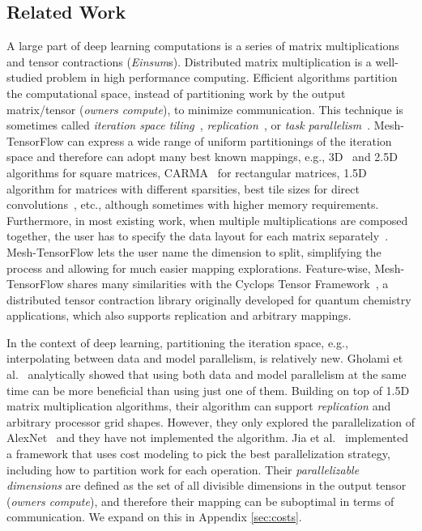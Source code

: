 \documentclass{article}
\begin{document}
\begin{itemize}
\section{Related Work}
A large part of deep learning computations is a series of matrix multiplications and tensor contractions (\emph{Einsum}s). Distributed matrix multiplication is a well-studied problem in high performance computing. Efficient algorithms partition the computational space, instead of partitioning work by the output matrix/tensor (\emph{owners compute}), to minimize communication. This technique is sometimes called \emph{iteration space tiling}~\cite{Wolfe:1989:MIS:76263.76337}, \emph{replication}~\cite{SD_EUROPAR_2011}, or \emph{task parallelism}~\cite{Calvin:2015:STA:2833179.2833186}. 
Mesh-TensorFlow can express a wide range of uniform partitionings of the iteration space 
and therefore can adopt many best known mappings, e.g., 3D~\cite{Aggarwal:1990:CCP:77831.77836, berntsen1989communication} and 2.5D~\cite{SD_EUROPAR_2011} algorithms for square matrices, CARMA~\cite{demmel2013communication} for rectangular matrices, 1.5D~\cite{SpDM3} algorithm for matrices with different sparsities, best tile sizes for direct convolutions~\cite{demmel2018communication}, etc., although sometimes with higher memory requirements. 
Furthermore, in most existing work,
when multiple multiplications are composed together, the user has to specify the data layout for each matrix separately~\cite{pmlr-v84-koanantakool18a}. Mesh-TensorFlow lets the user name the dimension to split, simplifying the process and allowing for much easier mapping explorations. Feature-wise, Mesh-TensorFlow shares many similarities with the Cyclops Tensor Framework~\cite{solomonik2014massively}, a distributed tensor contraction library originally developed for quantum chemistry applications, which also supports replication and arbitrary mappings.


In the context of deep learning, partitioning the iteration space, e.g., interpolating between data and model parallelism, is relatively new. Gholami et al.~\cite{gholami2017integrated} analytically showed that using both data and model parallelism at the same time can be more beneficial than using just one of them. Building on top of 1.5D matrix multiplication algorithms, their algorithm can support \emph{replication} and arbitrary processor grid shapes. However, they only explored the parallelization of AlexNet~\cite{krizhevsky2012imagenet} and they have not implemented the algorithm. Jia et al.~\cite{jia2018exploring, jia2018beyond} implemented a framework that uses cost modeling to pick the best parallelization strategy, including how to partition work for each operation. Their \emph{parallelizable dimensions} are defined as the set of all divisible dimensions in the output tensor (\emph{owners compute}), and therefore their mapping can be suboptimal in terms of communication. We expand on this in Appendix \ref{sec:costs}. 




\end{itemize}
\end{document}
